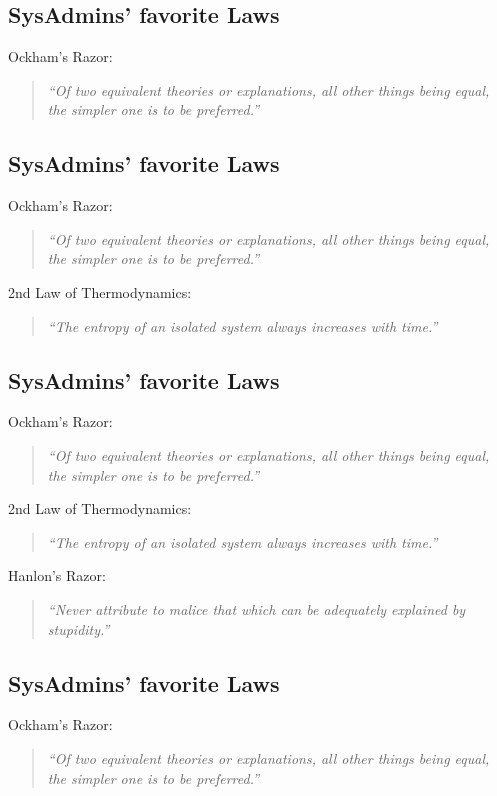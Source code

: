 \documentclass[xga]{xdvislides}
\newcommand{\smallish}{\fontsize{18}{18}\selectfont}
\begin{document}
\subsection{SysAdmins' favorite Laws}
\smallish
Ockham's Razor:
\begin{quote}
{\em ``Of two equivalent theories or explanations, all other things being
equal, the simpler one is to be preferred.''}
\end{quote}
\Normalsize

\subsection{SysAdmins' favorite Laws}
\smallish
Ockham's Razor:
\begin{quote}
{\em ``Of two equivalent theories or explanations, all other things being
equal, the simpler one is to be preferred.''}
\end{quote}

2nd Law of Thermodynamics:
\begin{quote}
{\em ``The entropy of an isolated system always increases with time.''}
\end{quote}
\Normalsize

\subsection{SysAdmins' favorite Laws}
\smallish
Ockham's Razor:
\begin{quote}
{\em ``Of two equivalent theories or explanations, all other things being
equal, the simpler one is to be preferred.''}
\end{quote}

2nd Law of Thermodynamics:
\begin{quote}
{\em ``The entropy of an isolated system always increases with time.''}
\end{quote}

Hanlon's Razor:
\begin{quote}
{\em ``Never attribute to malice that which can be adequately explained by
stupidity.''}
\end{quote}
\Normalsize

\subsection{SysAdmins' favorite Laws}
\smallish
Ockham's Razor:
\begin{quote}
{\em ``Of two equivalent theories or explanations, all other things being
equal, the simpler one is to be preferred.''}
\end{quote}
\end{document}
